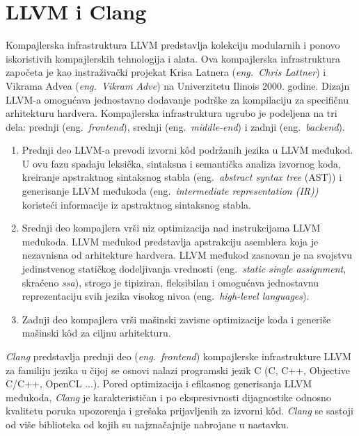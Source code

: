 \documentclass[12pt,oneside]{memoir}
\begin{document}
\section{LLVM i Clang}

Kompajlerska infrastruktura LLVM predstavlja kolekciju modularnih i ponovo iskoristivih kompajlerskih tehnologija i alata.
Ova kompajlerska infrastruktura zapo\v{c}eta je kao instraživački projekat Krisa Latnera (\textit{eng.~Chris Lattner}) i Vikrama Advea (\textit{eng.~Vikram Adve}) na Univerzitetu Ilinois 2000. godine.
Dizajn LLVM-a omogu\'{c}ava jednostavno dodavanje podr\v{s}ke za kompilaciju za specifi\v{c}nu arhitekturu hardvera. Kompajlerska infrastruktura
ugrubo je podeljena na tri dela: prednji (eng.~\textit{frontend}), srednji (eng.~\textit{middle-end}) i zadnji (eng.~\textit{backend}). 

\begin{enumerate}
  \item Prednji deo LLVM-a prevodi izvorni k\^od podr\v{z}anih jezika u LLVM međukod. U ovu fazu spadaju leksi\v{c}ka, sintaksna i semanti\v{c}ka analiza
  izvornog koda, kreiranje apstraktnog sintaksnog stabla (eng.~\textit{abstract syntax tree} (AST)) i generisanje LLVM međukoda (eng.~\textit{intermediate representation (IR))} koriste\'{c}i informacije iz apstraktnog sintaksnog stabla.
  \item{Srednji deo kompajlera vr\v{s}i niz optimizacija nad instrukcijama LLVM međukoda. LLVM međukod predstavlja apstrakciju asemblera koja je nezavnisna od arhitekture hardvera. LLVM međukod zasnovan je na svojstvu jedinstvenog stati\v{c}kog dodeljivanja vrednosti (eng.~\textit{static single assignment}, skra\'{c}eno \textit{ssa}), strogo je tipiziran, fleksibilan i omogu\'{c}ava jednostavnu reprezentaciju svih jezika visokog nivoa (eng.~\textit{high-level languages}).}
  \item{Zadnji deo kompajlera vr\v{s}i ma\v{s}inski zavisne optimizacije koda i generi\v{s}e ma\v{s}inski k\^{o}d za ciljnu arhitekturu.}
\end{enumerate}



\textit{Clang} predstavlja prednji deo (\textit{eng.~frontend}) kompajlerske infrastrukture LLVM za familiju jezika u \v{c}ijoj se osnovi nalazi programski jezik C (C, C++, Objective C/C++, OpenCL ...). Pored optimizacija i efikasnog generisanja LLVM međukoda, \textit{Clang} je karakterističan i po ekspresivnosti dijagnostike odnosno kvalitetu poruka upozorenja i grešaka prijavljenih za izvorni k\^{o}d. \textit{Clang} se sastoji od vi\v{s}e biblioteka od kojih su najznačajnije nabrojane u nastavku.
\end{document}
